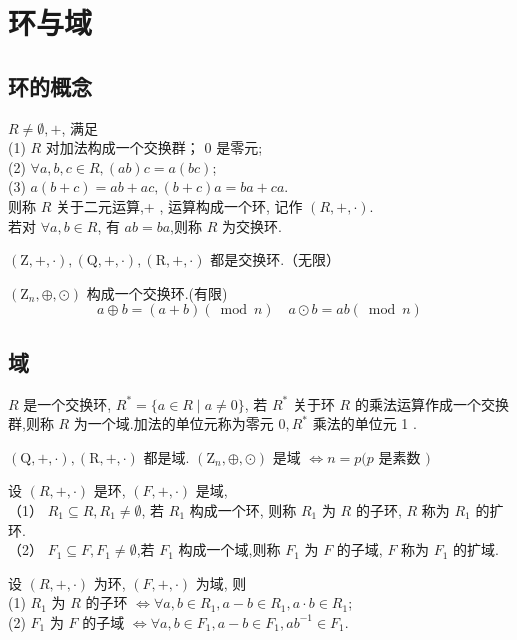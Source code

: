 \section{环与域}
\subsection{环的概念}
\begin{definition}
    $ R \neq \emptyset,+ $, 满足\\
(1) $ R $ 对加法构成一个交换群； 0 是零元;\\
(2) $ \forall a, b, c \in R,(a b) c=a(b c) $;\\
(3)
$a(b+c)=a b+a c ,(b+c) a=b a+c a .$\\
则称 $ R $ 关于二元运算,+ , 运算构成一个环, 记作 $ (R,+, \cdot) $.\\若对 $ \forall a, b \in R $, 有 $ a b=b a $,则称 $ R $ 为交换环.
\end{definition}
\begin{example}
    $ (\mathrm{Z},+, \cdot),(\mathrm{Q},+, \cdot),(\mathrm{R},+, \cdot) $ 都是交换环.（无限）
\end{example}
 
\begin{example}
    $ \left(\mathrm{Z}_{n}, \oplus, \odot\right) $ 构成一个交换环.(有限)
$$
a \oplus b=(a+b)(\bmod n) \quad
a \odot b=a b(\bmod n)
$$
\end{example}

\subsection{域}
\begin{definition}
    $ R $ 是一个交换环, $ R^{*}=\{a \in R \mid a \neq 0\} $, 若 $ R^{*} $ 关于环 $ R $ 的乘法运算作成一个交换群,则称 $ R $ 为一个域.加法的单位元称为零元 $ 0, R^{*} $ 乘法的单位元 1 .
\end{definition}
\begin{example}
    $ (\mathrm{Q},+, \cdot),(\mathrm{R},+, \cdot) $ 都是域. $ \left(\mathrm{Z}_{n}, \oplus, \odot\right) $ 是域 $ \Leftrightarrow n=p(p $ 是素数 $ ) $
\end{example}
\begin{definition}
    设 $ (R,+, \cdot) $ 是环, $ (F,+, \cdot) $ 是域,\\
（1） $ R_{1} \subseteq R, R_{1} \neq \emptyset $, 若 $ R_{1} $ 构成一个环, 则称 $ R_{1} $ 为 $ R $ 的子环, $ R $ 称为 $ R_{1} $ 的扩环.\\
（2） $ F_{1} \subseteq F, F_{1} \neq \emptyset $,若 $ F_{1} $ 构成一个域,则称 $ F_{1} $ 为 $ F $ 的子域, $ F $ 称为 $ F_{1} $ 的扩域.
\end{definition}
\begin{theorem}
    设 $ (R,+, \cdot) $ 为环, $ (F,+, \cdot) $ 为域, 则\\
(1) $ R_{1} $ 为 $ R $ 的子环 $ \Leftrightarrow \forall a, b \in R_{1}, a-b \in R_{1}, a \cdot b \in R_{1} $;\\
(2) $ F_{1} $ 为 $ F $ 的子域 $ \Leftrightarrow \forall a, b \in F_{1}, a-b \in F_{1}, a b^{-1} \in F_{1} $.
\end{theorem}

